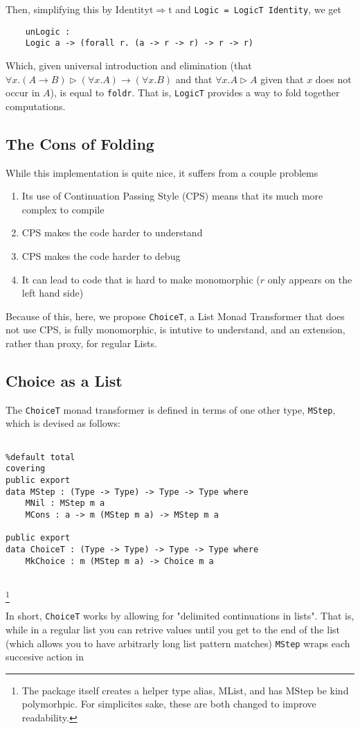 Then, simplifying this by $\mathrm{Identity t} \Rightarrow \mathrm{t}$ and \verb|Logic = LogicT Identity|, we get 
\begin{verbatim}
	unLogic :
	Logic a -> (forall r. (a -> r -> r) -> r -> r) 
\end{verbatim}

Which, given universal introduction and elimination (that $\forall x . (A \to B) \rhd (\forall x . A) \to (\forall x . B)$ and that $\forall x . A \rhd A$ given that $x$ does not occur in $A$), is equal to \verb|foldr|.
That is, \verb|LogicT| provides a way to fold together computations.

\subsection{The Cons of Folding}

While this implementation is quite nice, it suffers from a couple problems
\begin{enumerate}
	\item Its use of Continuation Passing Style (CPS) means that its much more complex to compile\needcite 
	\item CPS makes the code harder to understand\needcite 
	\item CPS makes the code harder to debug
	\item It can lead to code that is hard to make monomorphic ($r$ only appears on the left hand side)
	
\end{enumerate}

Because of this, here, we propose \verb|ChoiceT|, a List Monad Transformer that does not use CPS, is fully monomorphic, is intutive to understand, and an extension, rather than proxy, for regular Lists.

\subsection{Choice as a List}

The \verb|ChoiceT| monad transformer is defined in terms of one other type, \verb|MStep|, which is devised as follows:

\begin{verbatim}
	
%default total
covering
public export 
data MStep : (Type -> Type) -> Type -> Type where 
	MNil : MStep m a
	MCons : a -> m (MStep m a) -> MStep m a

public export 
data ChoiceT : (Type -> Type) -> Type -> Type where 
	MkChoice : m (MStep m a) -> Choice m a
	
\end{verbatim}
\footnote{The package itself creates a helper type alias, \textrm{MList}, and has \textrm{MStep} be kind polymorhpic.
	For simplicites sake, these are both changed to improve readability.}
	
In short, \verb|ChoiceT| works by allowing for "delimited continuations in lists".
That is, while in a regular list you can retrive values until you get to the end of the list (which allows you to have arbitrarly long list pattern matches) \verb|MStep| wraps each succesive action in 
